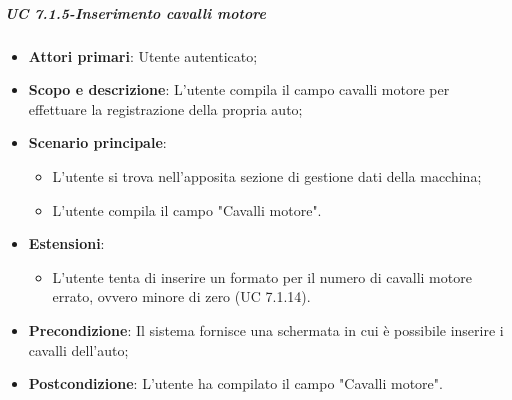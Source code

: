     \subparagraph{UC 7.1.5-Inserimento cavalli motore}
    \begin{itemize}
                \item \textbf{Attori primari}: Utente autenticato;
                
                 \item \textbf{Scopo e descrizione}: L'utente compila il campo  cavalli motore per effettuare la registrazione della propria auto;
                 \item \textbf{Scenario principale}: 
                 \begin{itemize}
                     \item L'utente si trova nell'apposita sezione di gestione dati della macchina;
                     \item L'utente compila il campo "Cavalli motore".
                 \end{itemize}
                 \item \textbf{Estensioni}:
                 \begin{itemize} 
                        \item L'utente tenta di inserire un formato per il numero di cavalli motore errato, ovvero minore di zero (UC 7.1.14).
                    \end{itemize}
                 \item \textbf{Precondizione}: Il sistema fornisce una schermata in cui è possibile inserire i cavalli dell'auto;
                 \item \textbf{Postcondizione}: L'utente ha compilato il campo "Cavalli motore".
                 \end{itemize}
                 
